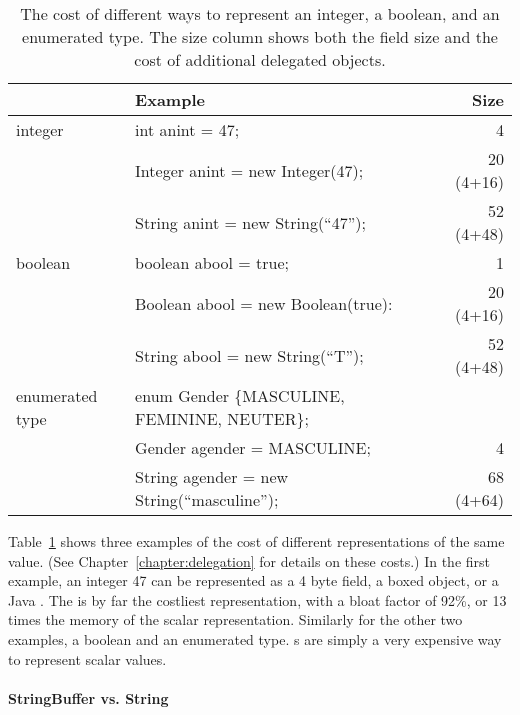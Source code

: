 \begin{table}
  \centering
\begin{tabular}{llr} \toprule \toprule
& Example & Size \\ \midrule \midrule
integer & int anint = 47; & 4 \\
\midrule
& Integer anint = new Integer(47); & 20 (4+16)  \\
\midrule
& String anint = new String(``47''); & 52 (4+48) \\
\midrule
\midrule
boolean & boolean abool = true; & 1\\
\midrule
& Boolean abool = new Boolean(true): & 20 (4+16) \\
\midrule
& String abool = new String(``T''); & 52 (4+48) \\
\midrule \midrule
enumerated type & enum Gender \{MASCULINE, FEMININE, NEUTER\}; &\\
& Gender agender = MASCULINE; & 4 \\
\midrule
& String agender = new String(``masculine''); & 68 (4+64) \\
\bottomrule \bottomrule
\end{tabular}
\caption{The cost of different ways to represent an integer, a boolean, and an
enumerated type. The size column shows both the field size and the cost of
additional delegated objects.}
\label{tab:data-sizes}
\end{table}

Table~\ref{tab:data-sizes} shows three examples of the cost of different
representations of the same value. (See Chapter~\ref{chapter:delegation} for
details on these costs.) In the first example, an integer 47 can be
represented as a 4 byte field, a boxed object, or a Java . 
The  is by far the costliest representation, with a bloat factor of
92\%, or 13 times the memory of the scalar representation.  Similarly for the other two examples, a
boolean and an enumerated type.
s are simply a very expensive way to represent scalar values.

\paragraph{StringBuffer vs. String}

